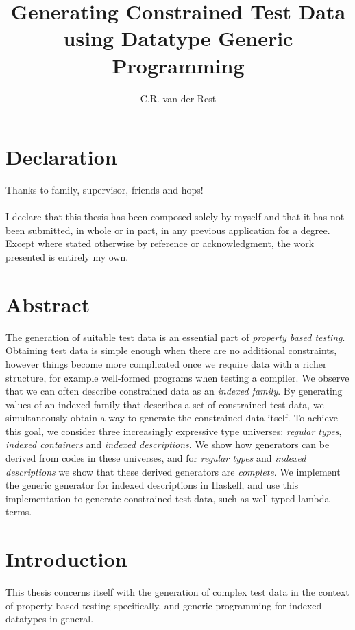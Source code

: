 \documentclass[a4paper,msc,twosized=semi]{uustthesis}
\title{Generating Constrained Test Data using Datatype Generic Programming}
\author{C.R. van der Rest}
\begin{document}
\maketitle

\frontmatter
\tableofcontents

\chapter{Declaration}
Thanks to family, supervisor, friends and hops!
\\ \\
I declare that this thesis has been composed solely by myself and that it has not been
submitted, in whole or in part, in any previous application for a degree. Except where
stated otherwise by reference or acknowledgment, the work presented is entirely my
own.

\chapter{Abstract}
The generation of suitable test data is an essential part of \emph{property based testing}. Obtaining test data is simple enough when there are no additional constraints, however things become more complicated once we require data with a richer structure, for example well-formed programs when testing a compiler. We observe that we can often describe constrained data as an \emph{indexed family}. By generating values of an indexed family that describes a set of constrained test data, we simultaneously obtain a way to generate the constrained data itself. To achieve this goal, we consider three increasingly expressive type universes: \emph{regular types}, \emph{indexed containers} and \emph{indexed descriptions}. We show how generators can be derived from codes in these universes, and for \emph{regular types} and \emph{indexed descriptions} we show that these derived generators are \emph{complete}. We implement the generic generator for indexed descriptions in Haskell, and use this implementation to generate constrained test data, such as well-typed lambda terms. 

\mainmatter

\chapter{Introduction}
This thesis concerns itself with the generation of complex test data in the context of property based testing specifically, and generic programming for indexed datatypes in general. 
\end{document}
